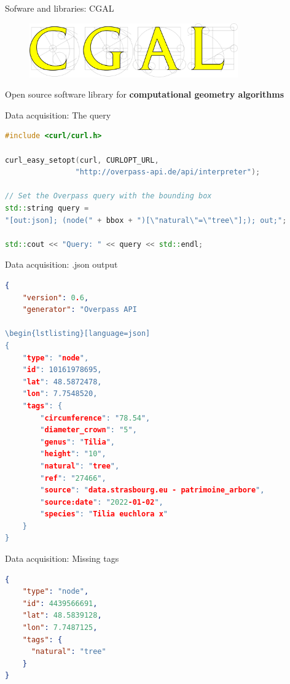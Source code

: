 \documentclass[10pt]{beamer}
\begin{document}
\begin{frame}{Sofware and libraries: CGAL}
  \Large
  \begin{figure}[H]
      \centering
      \includegraphics[width=0.8\textwidth]{images/cgal_logo.png}
  \end{figure}
  \begin{center}
    \Large Open source software library for \textbf{computational geometry algorithms}
  \end{center}
\end{frame}

\begin{frame}[fragile]{Data acquisition: The query}
  \begin{lstlisting}[language=C++]
#include <curl/curl.h>

curl_easy_setopt(curl, CURLOPT_URL,
                "http://overpass-api.de/api/interpreter");

// Set the Overpass query with the bounding box
std::string query =
"[out:json]; (node(" + bbox + ")[\"natural\"=\"tree\"];); out;";

std::cout << "Query: " << query << std::endl;
  \end{lstlisting}
\end{frame}


\begin{frame}[fragile]{Data acquisition: .json output}
  \begin{lstlisting}[language=json]
{
    "version": 0.6,
    "generator": "Overpass API

\begin{lstlisting}[language=json]
{
    "type": "node",
    "id": 10161978695,
    "lat": 48.5872478,
    "lon": 7.7548520,
    "tags": {
        "circumference": "78.54",
        "diameter_crown": "5",
        "genus": "Tilia",
        "height": "10",
        "natural": "tree",
        "ref": "27466",
        "source": "data.strasbourg.eu - patrimoine_arbore",
        "source:date": "2022-01-02",
        "species": "Tilia euchlora x"
    }
}
\end{lstlisting}
\end{frame}

\begin{frame}[fragile]{Data acquisition: Missing tags}

\begin{lstlisting}[language=json]
{
    "type": "node",
    "id": 4439566691,
    "lat": 48.5839128,
    "lon": 7.7487125,
    "tags": {
      "natural": "tree"
    }
}
\end{lstlisting}
\end{frame}
\end{document}
